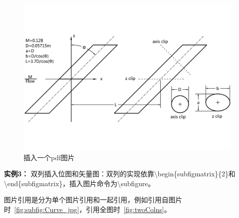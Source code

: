 \begin{figure}[htb]
\centering
   \includegraphics[width=12cm]{./img/Geom_pdf}
  \caption{插入一个pdf图片}
  \label{fig:visual}
\end{figure}

{\bf{实例3：}} 双列插入位图和矢量图：双列的实现依靠\textbackslash begin\{subfigmatrix\}\{2\}和\textbackslash end\{subfigmatrix\}，插入图片命令为\textbackslash subfigure。

图片引用是分为单个图片引用和一起引用，例如引用自图片时~\ref{fig:subfig:Curve_jpg}，引用全图时~\ref{fig:twoColns}。

